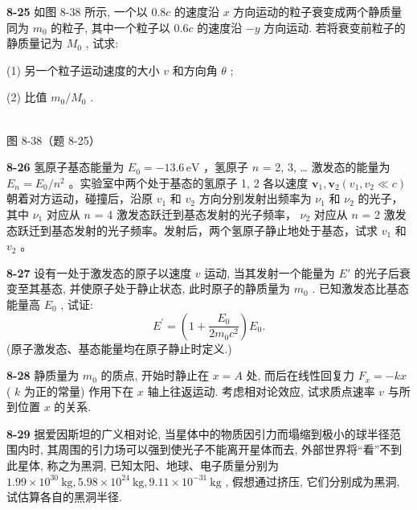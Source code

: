 \newpage

\textbf{8-25} 如图 8-38 所示, 一个以 $0.8c$ 的速度沿 $x$ 方向运动的粒子衰变成两个静质量同为 $m_{0}$ 的粒子, 其中一个粒子以 $0.6c$ 的速度沿 $-y$ 方向运动. 若将衰变前粒子的静质量记为 $M_{0}$ , 试求:

(1) 另一个粒子运动速度的大小 $v$ 和方向角 $\theta$ ;

(2) 比值 $m_{0}/M_{0}$ .

\begin{center}
\resizebox{0.50\textwidth}{!}{}\\[4pt]
{\small 图 8-38（题 8-25）}
\end{center}

\newpage

\textbf{8-26} 氢原子基态能量为 $E_{0} = -13.6 \, \mathrm{eV}$ ，氢原子 $n$ = 2, 3, … 激发态的能量为 $E_{n} = E_{0} / n^{2}$ 。实验室中两个处于基态的氢原子 1, 2 各以速度 $\boldsymbol{v}_{1}, \boldsymbol{v}_{2} (v_{1}, v_{2} \ll c)$ 朝着对方运动，碰撞后，沿原 $v_{1}$ 和 $v_{2}$ 方向分别发射出频率为 $\nu_{1}$ 和 $\nu_{2}$ 的光子，其中 $\nu_{1}$ 对应从 $n$ = 4 激发态跃迁到基态发射的光子频率， $\nu_{2}$ 对应从 $n$ = 2 激发态跃迁到基态发射的光子频率。发射后，两个氢原子静止地处于基态，试求 $v_{1}$ 和 $v_{2}$ 。

\newpage

\textbf{8-27} 设有一处于激发态的原子以速度 $v$ 运动, 当其发射一个能量为 $E'$ 的光子后衰变至其基态, 并使原子处于静止状态, 此时原子的静质量为 $m_0$ . 已知激发态比基态能量高 $E_0$ , 试证:
\[
E ^ {\prime} = \left(1 + \frac {E _ {0}}{2 m _ {0} c ^ {2}}\right) E _ {0}.
\]
(原子激发态、基态能量均在原子静止时定义.)

\newpage

\textbf{8-28} 静质量为 $m_0$ 的质点, 开始时静止在 $x = A$ 处, 而后在线性回复力 $F_x = -kx$ ( $k$ 为正的常量) 作用下在 $x$ 轴上往返运动. 考虑相对论效应, 试求质点速率 $v$ 与所到位置 $x$ 的关系.

\newpage

\textbf{8-29} 据爱因斯坦的广义相对论, 当星体中的物质因引力而塌缩到极小的球半径范围内时, 其周围的引力场可以强到使光子不能离开星体而去, 外部世界将“看”不到此星体, 称之为黑洞, 已知太阳、地球、电子质量分别为 $1.99 \times 10^{30} \mathrm{~kg}, 5.98 \times 10^{24} \mathrm{~kg}, 9.11 \times 10^{-31} \mathrm{~kg}$ , 假想通过挤压, 它们分别成为黑洞, 试估算各自的黑洞半径.

